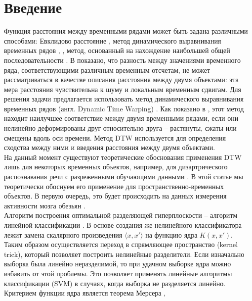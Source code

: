 \documentclass[12pt, twoside]{article}
\begin{document}
\section{Введение}
{Функция расстояния между временными рядами может быть задана различными
способами: Евклидово расстояние \cite{Evklid}, метод динамического выравнивания временных
рядов \cite{DTW1}, \cite{DTW2}, метод, основанный на нахождение наибольшей общей последовательности \cite{MaxSequence}.
В \cite{Noise} показано, что разность между значениями временного ряда, соответствующими различным временным отсчетам, не может рассматриваться в качестве описания расстояния между двумя объектами: эта мера расстояния чувствительна к
шуму и локальным временным сдвигам. Для решения задачи предлагается использовать метод динамического выравнивания временных рядов (англ. Dynamic Time
Warping) \cite{DTW}. Как показано в \cite{Thebestmethod}, этот метод находит наилучшее соответствие между
двумя временными рядами, если они нелинейно деформированы друг относительно
друга -- растянуты, сжаты или смещены вдоль оси времени. Метод DTW используется для определения сходства между ними и введения расстояния между двумя
объектами.\\

На данный момент существуют теоретические обоснования применения DTW лишь для некоторых временных объектов, например, для дизартрического распознавания речи с разреженными обучающими данными \cite{DisartreSpeech}. В этой статье мы теоретически обоснуем его применение для пространственно-временных объектов. В первую очередь, это будет происходить на данных измерения активности мозга обезьян \cite{Data}.\\


Алгоритм построения оптимальной разделяющей гиперплоскости -- алгоритм линейной классификации \cite{SVM_Bennett}. В основе создания же нелинейного классификатора лежит замена скалярного произведения $\langle x, x' \rangle$ на функцию ядра $K(x, x')$. Таким образом осуществляется переход в спрямляющее пространство (kernel trick), который позволяет построить нелинейные разделители. Если изначально выборка была линейно неразделимой, то при удачном выборке ядра можно избавить от этой проблемы. Это позволяет применять линейные алгоритмы классификации (SVM) в случаях, когда выборка не разделяется линейно. Критерием функции ядра является теорема Мерсера \cite{Mercer},\\




}
\end{document}
